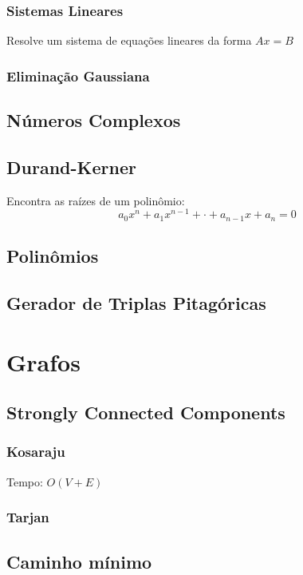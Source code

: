 \documentclass[12pt,a4paper]{article}
\begin{document}
			\subsubsection{Sistemas Lineares}
				Resolve um sistema de equações lineares da forma \(Ax = B\)
				
			\subsubsection{Eliminação Gaussiana}
				
		\subsection{Números Complexos}
			
		\subsection{Durand-Kerner}
			Encontra as raízes de um polinômio:
			\[ a_0 x^n + a_1 x^{n-1} + \cdot + a_{n-1} x + a_n = 0 \]
			
		\subsection{Polinômios}
			
		\subsection{Gerador de Triplas Pitagóricas}
			

	\section{Grafos}
		\subsection{Strongly Connected Components}
			\subsubsection{Kosaraju}
				Tempo: \( O(V + E) \)
				
			\subsubsection{Tarjan}
				
		\subsection{Caminho mínimo}
\end{document}
